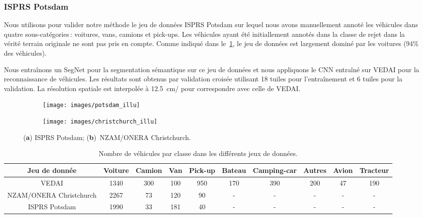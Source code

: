 \subsubsection{ISPRS Potsdam}

Nous utilisons pour valider notre méthode le jeu de données \gls{ISPRS} Potsdam sur lequel nous avons manuellement annoté les véhicules dans quatre sous-catégories\,: voitures, vans, camions et pick-ups. Les véhicules ayant été initiallement annotés dans la classe de rejet dans la vérité terrain originale ne sont pas pris en compte. Comme indiqué dans le~\cref{tab:vehicle_counts}, le jeu de données est largement dominé par les voitures (94\% des véhicules).

Nous entraînons un SegNet pour la segmentation sémantique sur ce jeu de données et nous appliquons le \gls{CNN} entraîné sur \gls{VEDAI} pour la reconnaissance de véhicules. Les résultats sont obtenus par validation croisée utilisant 18 tuiles pour l'entraînement et 6 tuiles pour la validation. La résolution spatiale est interpolée à \SI{12,5}{\centi\meter/\px} pour correspondre avec celle de \gls{VEDAI}.

\begin{figure}[t]
\centering
	\begin{subfigure}[]{0.45\textwidth}
    	\texttt{[image: images/potsdam\_illu]}
   \caption{}
    \end{subfigure}
    \begin{subfigure}[]{0.45\textwidth}
    	\texttt{[image: images/christchurch\_illu]}
\caption{}
    \end{subfigure}\vspace{-12pt}
    \caption{(\textbf{a}) ISPRS Potsdam; (\textbf{b})~NZAM/ONERA Christchurch.}
    \label{fig:datasets}
\end{figure}
\unskip
\begin{table}[t]
	\setlength\tabcolsep{2.5pt}
    \caption{Nombre de véhicules par classe dans les différents jeux de données.}
    \label{tab:vehicle_counts}
	\begin{tabularx}{\textwidth}{c c c c c c c c cc}
    \toprule
    \textbf{Jeu de donnée} & \textbf{Voiture} & \textbf{Camion} & \textbf{Van} & \textbf{Pick-up} & \textbf{Bateau} & \textbf{Camping-car} & \textbf{Autres} & \textbf{Avion} & \textbf{Tracteur}\\
    \midrule
    VEDAI & 1340 &  300 & 100 & 950 & 170 & 390 & 200 & 47 & 190\\
    NZAM/ONERA Christchurch & 2267 & 73 & 120 & 90 & - & - & - & - & -\\
    ISPRS Potsdam & 1990 & 33 & 181 & 40 & - & - & - & - & -\\
    \bottomrule
    \end{tabularx}
\end{table}

